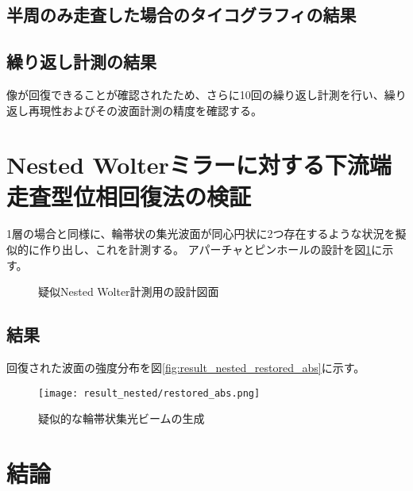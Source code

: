 \subsection{半周のみ走査した場合のタイコグラフィの結果}

\subsection{繰り返し計測の結果}

像が回復できることが確認されたため、さらに10回の繰り返し計測を行い、繰り返し再現性およびその波面計測の精度を確認する。


\clearpage
\newpage

\section{Nested Wolterミラーに対する下流端走査型位相回復法の検証}

1層の場合と同様に、輪帯状の集光波面が同心円状に2つ存在するような状況を擬似的に作り出し、これを計測する。
アパーチャとピンホールの設計を図\ref{fig:lens_nested_pinhole_ring_aperture}に示す。

\begin{figure}[!ht]
\centering

\caption[]{疑似Nested Wolter計測用の設計図面}
\label{fig:lens_nested_pinhole_ring_aperture}
\end{figure}

\subsection{結果}

回復された波面の強度分布を図\ref{fig:result_nested_restored_abs}に示す。

\begin{figure}[!ht]
\centering
\texttt{[image: result\_nested/restored\_abs.png]}
\caption{疑似的な輪帯状集光ビームの生成}
\label{fig:result_nested_restroed_abs}
\end{figure}



\clearpage
\newpage


\section{結論}
\label{chap4_conclusion}


